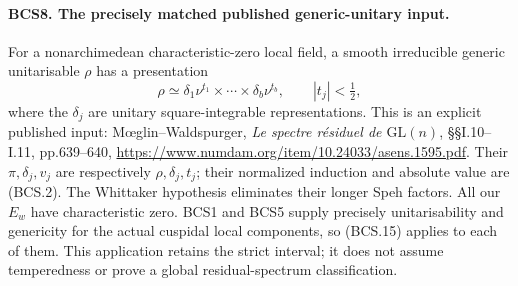 
\paragraph{BCS8. The precisely matched published generic-unitary input.}
\label{claim:BCS8}
For a nonarchimedean characteristic-zero local field, a smooth
irreducible generic unitarisable \(\rho\) has a presentation
\[
       \rho\simeq\delta_1\nu^{t_1}\times\cdots\times
                   \delta_b\nu^{t_b},\qquad |t_j|<\tfrac12,
 \tag{BCS.15}
\]
where the \(\delta_j\) are unitary square-integrable representations.
This is an explicit published input: M\oe glin--Waldspurger,
\emph{Le spectre r\'esiduel de \(\mathrm{GL}(n)\)},
\S\S I.10--I.11, pp.639--640,
\url{https://www.numdam.org/item/10.24033/asens.1595.pdf}.
Their \(\pi,\delta_j,v_j\) are respectively
\(\rho,\delta_j,t_j\); their normalized induction and absolute
value are (BCS.2).  The Whittaker hypothesis eliminates their longer
Speh factors.  All our \(E_w\) have characteristic zero.  BCS1 and
BCS5 supply precisely unitarisability and genericity for the actual
cuspidal local components, so (BCS.15) applies to each of them.
This application retains the strict interval; it does not assume
temperedness or prove a global residual-spectrum classification.

